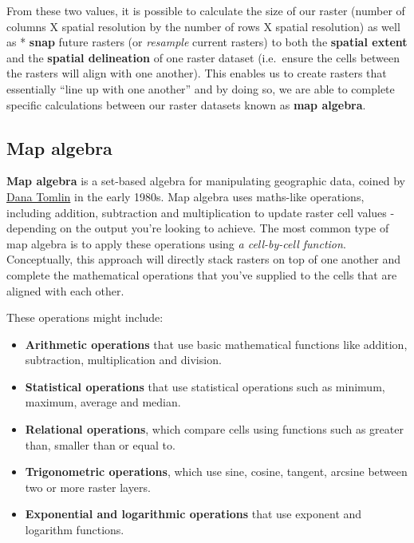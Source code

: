 \documentclass[
]{book}
\providecommand{\tightlist}{%
  \setlength{\itemsep}{0pt}\setlength{\parskip}{0pt}}
\begin{document}
From these two values, it is possible to calculate the size of our raster (number of columns X spatial resolution by the number of rows X spatial resolution) as well as * \textbf{snap} future rasters (or \emph{resample} current rasters) to both the \textbf{spatial extent} and the \textbf{spatial delineation} of one raster dataset (i.e.~ensure the cells between the rasters will align with one another). This enables us to create rasters that essentially ``line up with one another'' and by doing so, we are able to complete specific calculations between our raster datasets known as \textbf{map algebra}.

\hypertarget{map-algebra}{%
\subsection{Map algebra}\label{map-algebra}}

\textbf{Map algebra} is a set-based algebra for manipulating geographic data, coined by \href{https://en.wikipedia.org/wiki/Dana_Tomlin}{Dana Tomlin} in the early 1980s. Map algebra uses maths-like operations, including addition, subtraction and multiplication to update raster cell values - depending on the output you're looking to achieve. The most common type of map algebra is to apply these operations using \emph{a cell-by-cell function}. Conceptually, this approach will directly stack rasters on top of one another and complete the mathematical operations that you've supplied to the cells that are aligned with each other.

These operations might include:

\begin{itemize}
\tightlist
\item
  \textbf{Arithmetic operations} that use basic mathematical functions like addition, subtraction, multiplication and division.
\item
  \textbf{Statistical operations} that use statistical operations such as minimum, maximum, average and median.
\item
  \textbf{Relational operations}, which compare cells using functions such as greater than, smaller than or equal to.
\item
  \textbf{Trigonometric operations}, which use sine, cosine, tangent, arcsine between two or more raster layers.
\item
  \textbf{Exponential and logarithmic operations} that use exponent and logarithm functions.
\end{itemize}
\end{document}

